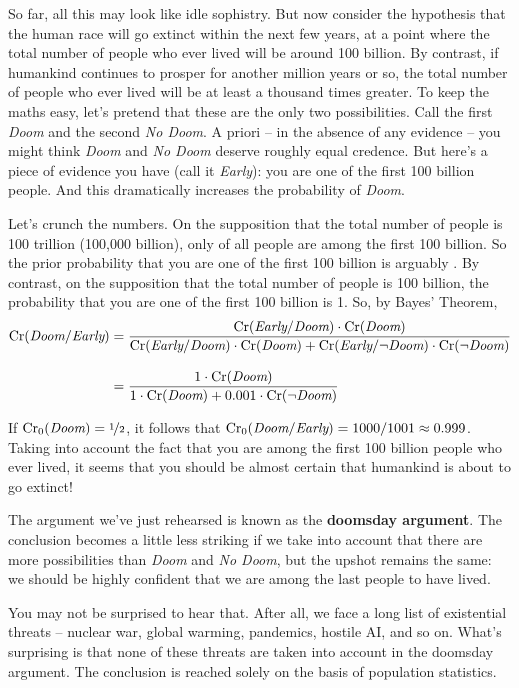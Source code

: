 {So far, all this may look like idle sophistry. But now consider the
hypothesis that the human race will go extinct within the next few
years, at a point where the total number of people who ever lived will
be around 100 billion. By contrast, if humankind continues to prosper
for another million years or so, the total number of people who ever
lived will be at least a thousand times greater. To keep the maths
easy, let's pretend that these are the only two possibilities. Call
the first \emph{Doom} and the second \emph{No Doom}. A priori -- in
the absence of any evidence -- you might think \emph{Doom} and
\emph{No Doom} deserve roughly equal credence. But here's a piece of
evidence you have (call it \emph{Early}): you are one of the first 100
billion people. And this dramatically increases the probability of
\emph{Doom}.

Let's crunch the numbers. On the supposition that the total number of
people is 100 trillion (100,000 billion), only  of
all people are among the first 100 billion. So the prior probability
that you are one of the first 100 billion is arguably
. By contrast, on the supposition that the total
number of people is 100 billion, the probability that you are one of
the first 100 billion is 1. So, by Bayes' Theorem,
\begin{align*}
  \text{Cr}(\emph{Doom}/\emph{Early}) &= \frac{\text{Cr}(\emph{Early}/\emph{Doom}) \cdot \text{Cr}(\emph{Doom})}{\text{Cr}(\emph{Early}/\emph{Doom}) \cdot \text{Cr}(\emph{Doom}) + \text{Cr}(\emph{Early}/\neg\emph{Doom}) \cdot \text{Cr}(\neg \emph{Doom})}\\[3mm]
    &= \frac{1 \cdot \text{Cr}(\emph{Doom})}{1 \cdot \text{Cr}(\emph{Doom}) + 0.001 \cdot \text{Cr}(\neg\emph{Doom})}
\end{align*}

\smallskip 

If $\text{Cr}_0(\emph{Doom}) = \nicefrac{1}{2}$, it follows that
$\text{Cr}_0(\emph{Doom}/\emph{Early}) = 1000/1001 \approx 0.999$. Taking into
account the fact that you are among the first 100 billion people who
ever lived, it seems that you should be almost certain that humankind is
about to go extinct!

The argument we've just rehearsed is known as the \textbf{doomsday
  argument}. The conclusion becomes a little less striking if we take
into account that there are more possibilities than \emph{Doom} and
\emph{No Doom}, but the upshot remains the same: we should be highly
confident that we are among the last people to have lived.

You may not be surprised to hear that. After all, we face a long list
of existential threats -- nuclear war, global warming,
pandemics, hostile AI, and so on. What's surprising is that none of
these threats are taken into account in the doomsday argument. The
conclusion is reached solely on the basis of population statistics.

}
